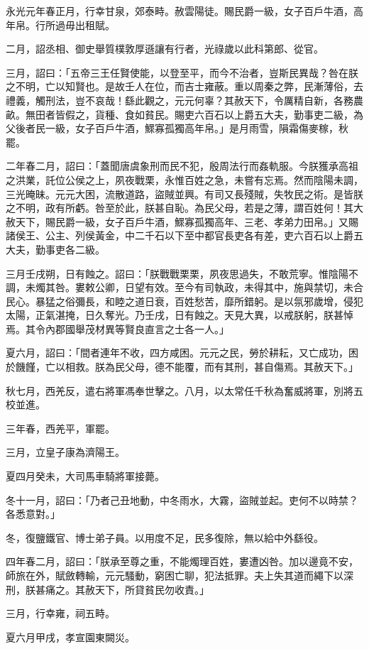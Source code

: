 \begin{pinyinscope}
永光元年春正月，行幸甘泉，郊泰畤。赦雲陽徒。賜民爵一級，女子百戶牛酒，高年帛。行所過毋出租賦。

二月，詔丞相、御史舉質樸敦厚遜讓有行者，光祿歲以此科第郎、從官。

三月，詔曰：「五帝三王任賢使能，以登至平，而今不治者，豈斯民異哉？咎在朕之不明，亡以知賢也。是故壬人在位，而吉士雍蔽。重以周秦之弊，民漸薄俗，去禮義，觸刑法，豈不哀哉！繇此觀之，元元何辜？其赦天下，令厲精自新，各務農畝。無田者皆假之，貨種、食如貧民。賜吏六百石以上爵五大夫，勤事吏二級，為父後者民一級，女子百戶牛酒，鰥寡孤獨高年帛。」是月雨雪，隕霜傷麥稼，秋罷。

二年春二月，詔曰：「蓋聞唐虞象刑而民不犯，殷周法行而姦軌服。今朕獲承高祖之洪業，託位公侯之上，夙夜戰栗，永惟百姓之急，未嘗有忘焉。然而陰陽未調，三光晻昧。元元大困，流散道路，盜賊並興。有司又長殘賊，失牧民之術。是皆朕之不明，政有所虧。咎至於此，朕甚自恥。為民父母，若是之薄，謂百姓何！其大赦天下，賜民爵一級，女子百戶牛酒，鰥寡孤獨高年、三老、孝弟力田帛。」又賜諸侯王、公主、列侯黃金，中二千石以下至中都官長吏各有差，吏六百石以上爵五大夫，勤事吏各二級。

三月壬戌朔，日有蝕之。詔曰：「朕戰戰栗栗，夙夜思過失，不敢荒寧。惟陰陽不調，未燭其咎。婁敕公卿，日望有效。至今有司執政，未得其中，施與禁切，未合民心。暴猛之俗彌長，和睦之道日衰，百姓愁苦，靡所錯躬。是以氛邪歲增，侵犯太陽，正氣湛掩，日久奪光。乃壬戌，日有蝕之。天見大異，以戒朕躬，朕甚悼焉。其令內郡國舉茂材異等賢良直言之士各一人。」

夏六月，詔曰：「間者連年不收，四方咸困。元元之民，勞於耕耘，又亡成功，困於饑饉，亡以相救。朕為民父母，德不能覆，而有其刑，甚自傷焉。其赦天下。」

秋七月，西羌反，遣右將軍馮奉世擊之。八月，以太常任千秋為奮威將軍，別將五校並進。

三年春，西羌平，軍罷。

三月，立皇子康為濟陽王。

夏四月癸未，大司馬車騎將軍接薨。

冬十一月，詔曰：「乃者己丑地動，中冬雨水，大霧，盜賊並起。吏何不以時禁？各悉意對。」

冬，復鹽鐵官、博士弟子員。以用度不足，民多復除，無以給中外繇役。

四年春二月，詔曰：「朕承至尊之重，不能燭理百姓，婁遭凶咎。加以邊竟不安，師旅在外，賦斂轉輸，元元騷動，窮困亡聊，犯法抵罪。夫上失其道而繩下以深刑，朕甚痛之。其赦天下，所貸貧民勿收責。」

三月，行幸雍，祠五畤。

夏六月甲戌，孝宣園東闕災。


\end{pinyinscope}
